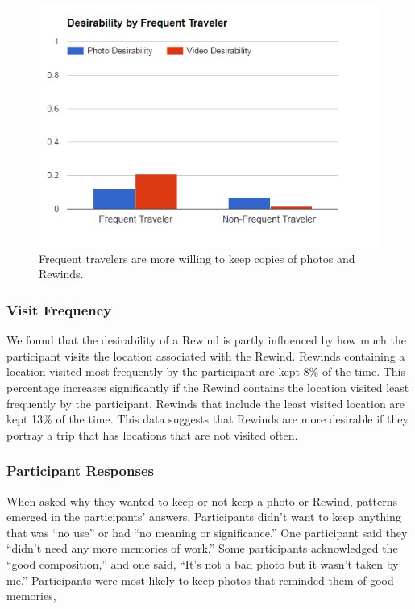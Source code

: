 \documentclass{sigchi}
\begin{document}
\begin{figure}
   \centering
     \includegraphics[width=1\linewidth]{FreqTraveler_keep_2}
     \caption{Frequent travelers are more willing to keep copies of photos and Rewinds.}
     \label{fig:frequencydesire}
\end{figure}

\subsubsection{Visit Frequency}
We found that the desirability of a Rewind is partly influenced by how much the participant visits the location associated with the Rewind. Rewinds containing a location visited most frequently by the participant are kept 8\% of the time. This percentage increases significantly if the Rewind contains the location visited least frequently by the participant. Rewinds that include the least visited location are kept 13\% of the time. This data suggests that Rewinds are more desirable if they portray a trip that has locations that are not visited often.


\subsubsection{Participant Responses}
When asked why they wanted to keep or not keep a photo or Rewind, patterns emerged in the participants' answers. Participants didn't want to keep anything that was ``no use'' or had ``no meaning or significance.'' One participant said they ``didn't need any more memories of work.'' Some participants acknowledged the ``good composition,'' and one said, ``It's not a bad photo but it wasn't taken by me.'' Participants were most likely to keep photos that reminded them of good memories, 
\end{document}
